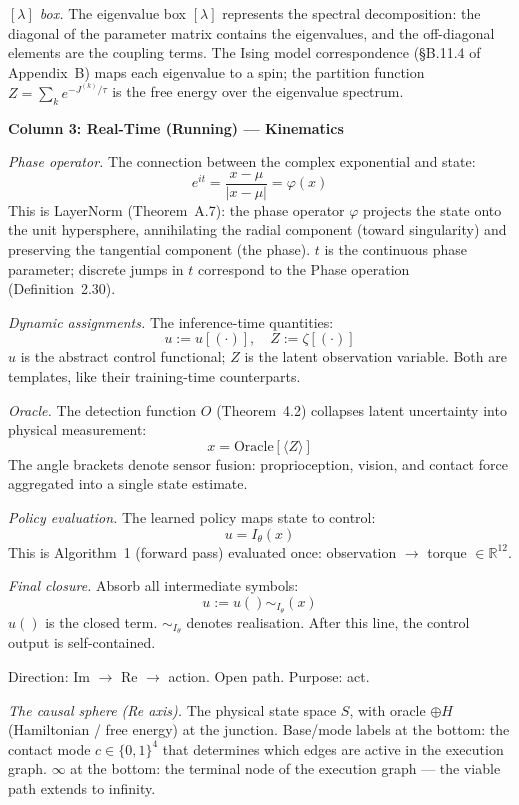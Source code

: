 \documentclass[11pt,a4paper]{article}
\theoremstyle{definition}
\theoremstyle{remark}
\begin{document}
\noindent\textit{$[\lambda]$ box.} The eigenvalue box $[\lambda]$ represents the spectral decomposition: the diagonal of the parameter matrix contains the eigenvalues, and the off-diagonal elements are the coupling terms. The Ising model correspondence (\S B.11.4 of Appendix~B) maps each eigenvalue to a spin; the partition function $Z = \sum_k e^{-J^{(k)}/\tau}$ is the free energy over the eigenvalue spectrum.

\bigskip
\noindent\textbf{Column 3: Real-Time (Running) --- Kinematics}

\noindent\textit{Phase operator.} The connection between the complex exponential and state:
\[
  e^{it} = \frac{x - \mu}{|x - \mu|} = \varphi(x)
\]
This is LayerNorm (Theorem~A.7): the phase operator $\varphi$ projects the state onto the unit hypersphere, annihilating the radial component (toward singularity) and preserving the tangential component (the phase). $t$ is the continuous phase parameter; discrete jumps in $t$ correspond to the Phase operation (Definition~2.30).

\noindent\textit{Dynamic assignments.} The inference-time quantities:
\[
  u := u[(\cdot)], \quad Z := \zeta[(\cdot)]
\]
$u$ is the abstract control functional; $Z$ is the latent observation variable. Both are templates, like their training-time counterparts.

\noindent\textit{Oracle.} The detection function $O$ (Theorem~4.2) collapses latent uncertainty into physical measurement:
\[
  x = \text{Oracle}[\langle Z \rangle]
\]
The angle brackets denote sensor fusion: proprioception, vision, and contact force aggregated into a single state estimate.

\noindent\textit{Policy evaluation.} The learned policy maps state to control:
\[
  u = I_\theta(x)
\]
This is Algorithm~1 (forward pass) evaluated once: observation $\to$ torque $\in \mathbb{R}^{12}$.

\noindent\textit{Final closure.} Absorb all intermediate symbols:
\[
  u := u() \sim_{I_\theta}(x)
\]
$u()$ is the closed term. $\sim_{I_\theta}$ denotes realisation. After this line, the control output is self-contained.

Direction: Im $\to$ Re $\to$ action. Open path. Purpose: act.

\noindent\textit{The causal sphere (Re axis).} The physical state space $S$, with oracle $\oplus H$ (Hamiltonian / free energy) at the junction. Base/mode labels at the bottom: the contact mode $c \in \{0,1\}^4$ that determines which edges are active in the execution graph. $\infty$ at the bottom: the terminal node of the execution graph --- the viable path extends to infinity.
\end{document}
